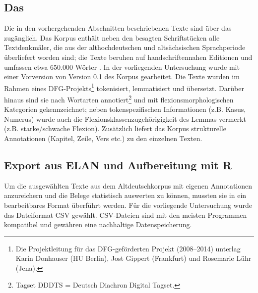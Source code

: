 \subsection{Das } \label{sec:ddd}

Die in den vorhergehenden Abschnitten beschriebenen Texte sind über das  \parencite{Donhauser2015} zugänglich. Das Korpus enthält neben den besagten Schriftstücken alle Textdenkmäler, die aus der althochdeutschen und altsächsischen Sprachperiode überliefert worden sind; die Texte beruhen auf handschriftennahen Editionen und umfassen etwa 650.000 Wörter \parencite[s. auch][522--323]{Dipper2015}. In der vorliegenden Untersuchung wurde mit einer Vorversion von Version 0.1 des Korpus gearbeitet. 
Die Texte wurden im Rahmen eines DFG-Projekts\footnote{Die Projektleitung für das DFG-geförderten Projekt (2008--2014) unterlag Karin Donhauser (HU Berlin), Jost Gippert (Frankfurt) und Rosemarie Lühr (Jena).} tokenisiert, lemmatisiert und übersetzt. Darüber hinaus sind sie nach Wortarten annotiert\footnote{Tagset DDDTS = Deutsch Diachron Digital Tagset.} und mit flexionsmorphologischen Kategorien gekennzeichnet; neben tokenspezifischen Informationen (z.B. Kasus, Numerus) wurde auch die Flexionsklassenzugehörigigkeit des Lemmas vermerkt (z.B. starke/schwache Flexion). Zusätzlich liefert das Korpus strukturelle Annotationen (Kapitel, Zeile, Vers etc.) zu den einzelnen Texten. 


\subsection{Export aus ELAN und Aufbereitung mit R}\label{sec:aufbereitung}

Um die ausgewählten Texte aus dem Altdeutschkorpus mit eigenen Annotationen anzureichern und die Belege  statistisch auswerten zu können, mussten sie in ein bearbeitbares Format überführt werden. Für die vorliegende Untersuchung wurde das Dateiformat CSV gewählt. CSV-Dateien sind mit den meisten Programmen kompatibel und gewähren eine nachhaltige Datenspeicherung. 

